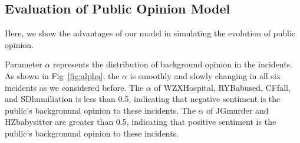 \documentclass[runningheads]{llncs}
\begin{document}
\subsection{Evaluation of Public Opinion Model}
Here, we show the advantages of our model in simulating the evolution of public opinion. 

Parameter $\alpha$ represents the distribution of background opinion in the incidents. As shown in Fig~\ref{fig:alpha}, the $\alpha$ is smoothly and slowly changing in all six incidents as we considered before. The $\alpha$ of WZXHospital, RYBabused, CFfall, and SDhumiliation is less than 0.5, indicating that negative sentiment is the public’s backgronund opinion to these incidents. The $\alpha$ of JGmurder and HZbabysitter are greater than 0.5, indicating that positive sentiment is the public’s backgronund opinion to these incidents.
\end{document}
